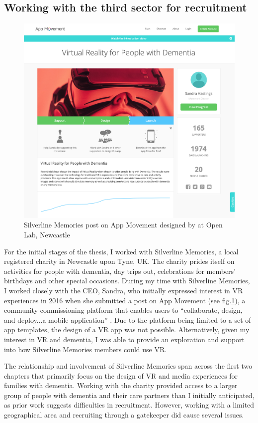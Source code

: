 \subsection{Working with the third sector for recruitment}
\label{Method:ThirdSector}
\begin{figure}[htp]
    \centering
    \includegraphics[width=0.6\linewidth]{Images/Methodology/AppMovement-SilverlineMemories.png}
    \caption{Silverline Memories post on App Movement designed by  \cite{garbett_app_2016} at Open Lab, Newcastle}
    \label{fig:AppMovement-Sandra}
\end{figure}

For the initial  stages of the thesis, I worked with Silverline Memories, a local registered charity in Newcastle upon Tyne, UK. The charity prides itself on activities for people with dementia, day trips out, celebrations for members' birthdays and other special occasions. During my time with Silverline Memories, I worked closely with the CEO, Sandra, who initially expressed interest in VR experiences in 2016 when she submitted a post on App Movement (see fig.\ref{fig:AppMovement-Sandra}), a community commissioning platform that enables users to ``collaborate, design, and deploy...a mobile application'' \citep{garbett_app_2016}. Due to the platform being limited to a set of app templates, the design of a VR app was not possible. Alternatively, given my interest in VR and dementia, I was able to provide an exploration and support into how Silverline Memories members could use VR. 

The relationship and involvement of Silverline Memories span across the first two chapters that primarily focus on the design of VR and media experiences for families with dementia. Working with the charity provided access to a larger group of people with dementia and their care partners than I initially anticipated, as prior work suggests difficulties in recruitment. However, working with a limited geographical area and recruiting through a gatekeeper did cause several issues. 

